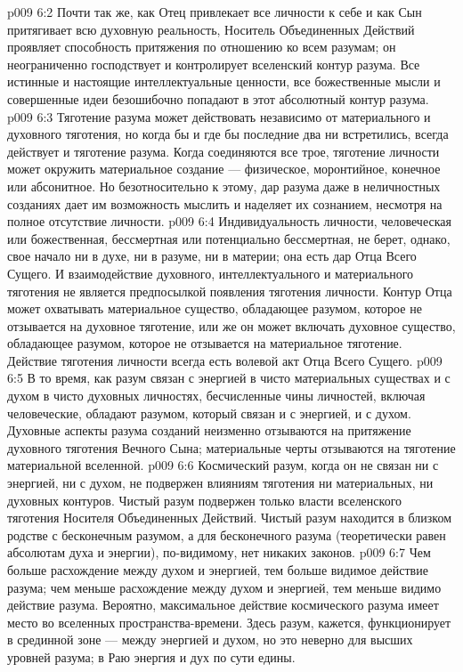\vs p009 6:2 Почти так же, как Отец привлекает все личности к себе и как Сын притягивает всю духовную реальность, Носитель Объединенных Действий проявляет способность притяжения по отношению ко всем разумам; он неограниченно господствует и контролирует вселенский контур разума. Все истинные и настоящие интеллектуальные ценности, все божественные мысли и совершенные идеи безошибочно попадают в этот абсолютный контур разума.
\vs p009 6:3 \pc Тяготение разума может действовать независимо от материального и духовного тяготения, но когда бы и где бы последние два ни встретились, всегда действует и тяготение разума. Когда соединяются все трое, тяготение личности может окружить материальное создание --- физическое, моронтийное, конечное или абсонитное. Но безотносительно к этому, дар разума даже в неличностных созданиях дает им возможность мыслить и наделяет их сознанием, несмотря на полное отсутствие личности.
\vs p009 6:4 \pc Индивидуальность личности, человеческая или божественная, бессмертная или потенциально бессмертная, не берет, однако, свое начало ни в духе, ни в разуме, ни в материи; она есть дар Отца Всего Сущего. И взаимодействие духовного, интеллектуального и материального тяготения не является предпосылкой появления тяготения личности. Контур Отца может охватывать материальное существо, обладающее разумом, которое не отзывается на духовное тяготение, или же он может включать духовное существо, обладающее разумом, которое не отзывается на материальное тяготение. Действие тяготения личности всегда есть волевой акт Отца Всего Сущего.
\vs p009 6:5 В то время, как разум связан с энергией в чисто материальных существах и с духом в чисто духовных личностях, бесчисленные чины личностей, включая человеческие, обладают разумом, который связан и с энергией, и с духом. Духовные аспекты разума созданий неизменно отзываются на притяжение духовного тяготения Вечного Сына; материальные черты отзываются на тяготение материальной вселенной.
\vs p009 6:6 \pc Космический разум, когда он не связан ни с энергией, ни с духом, не подвержен влияниям тяготения ни материальных, ни духовных контуров. Чистый разум подвержен только власти вселенского тяготения Носителя Объединенных Действий. Чистый разум находится в близком родстве с бесконечным разумом, а для бесконечного разума (теоретически равен абсолютам духа и энергии), по\hyp{}видимому, нет никаких законов.
\vs p009 6:7 Чем больше расхождение между духом и энергией, тем больше видимое действие разума; чем меньше расхождение между духом и энергией, тем меньше видимо действие разума. Вероятно, максимальное действие космического разума имеет место во вселенных пространства\hyp{}времени. Здесь разум, кажется, функционирует в срединной зоне --- между энергией и духом, но это неверно для высших уровней разума; в Раю энергия и дух по сути едины.
